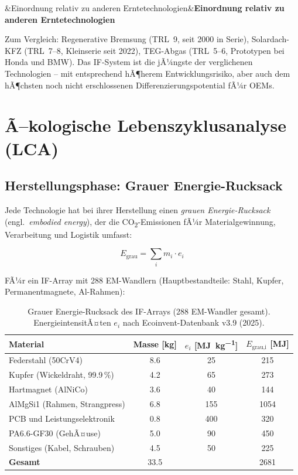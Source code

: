 ﻿\documentclass[12pt, a4paper]{report}
\newenvironment{hinweis}[1][]{%
  \begin{hinweisframe}\sloppy%
  \ifx&#1&\else\textbf{#1}\par\smallskip\fi}{\end{hinweisframe}}
\theoremstyle{definition}
\theoremstyle{remark}
\begin{document}
\begin{hinweis}[Einordnung relativ zu anderen Erntetechnologien]
  Zum Vergleich: Regenerative Bremsung (TRL~9, seit 2000 in Serie),
  Solardach-KFZ (TRL~7--8, Kleinserie seit 2022), TEG-Abgas
  (TRL~5--6, Prototypen bei Honda und BMW). Das IF-System ist die
  jÃ¼ngste der verglichenen Technologien -- mit entsprechend hÃ¶herem
  Entwicklungsrisiko, aber auch dem hÃ¶chsten noch nicht erschlossenen
  Differenzierungspotential fÃ¼r OEMs.
\end{hinweis}

\section{Ã–kologische Lebenszyklusanalyse (LCA)}
\label{sec:lca}

\subsection{Herstellungsphase: Grauer Energie-Rucksack}

Jede Technologie hat bei ihrer Herstellung einen \emph{grauen Energie-Rucksack}
(engl.\ \emph{embodied energy}), der die CO\textsubscript{2}-Emissionen fÃ¼r
Materialgewinnung, Verarbeitung und Logistik umfasst:

\begin{equation}
  E_{\text{grau}} = \sum_{i} m_i \cdot e_i
  \label{eq:e_grau}
\end{equation}

FÃ¼r ein IF-Array mit 288 EM-Wandlern (Hauptbestandteile: Stahl, Kupfer,
Permanentmagnete, Al-Rahmen):

\begin{table}[H]
  \centering
  \caption{Grauer Energie-Rucksack des IF-Arrays (288 EM-Wandler gesamt).
           EnergieintensitÃ¤ten $e_i$ nach Ecoinvent-Datenbank v3.9 (2025).}
  \label{tab:grau_energie}
  \begin{tabular}{lSSS}
    \toprule
    Material & {Masse [kg]} & {$e_i$ [\si{\mega\joule\per\kilo\gram}]}
             & {$E_{\text{grau,i}}$ [\si{\mega\joule}]} \\
    \midrule
    Federstahl (50CrV4)           &  8.6 &  25 &  215 \\
    Kupfer (Wickeldraht, 99.9\,\%) &  4.2 &  65 &  273 \\
    Hartmagnet (AlNiCo)           &  3.6 &  40 &  144 \\
    AlMgSi1 (Rahmen, Strangpress) &  6.8 & 155 & 1054 \\
    PCB und Leistungselektronik   &  0.8 & 400 &  320 \\
    PA6.6-GF30 (GehÃ¤use)          &  5.0 &  90 &  450 \\
    Sonstiges (Kabel, Schrauben)  &  4.5 &  50 &  225 \\
    \midrule
    \textbf{Gesamt}               & 33.5 &     & 2681 \\
    \bottomrule
  \end{tabular}
\end{table}
\end{document}
